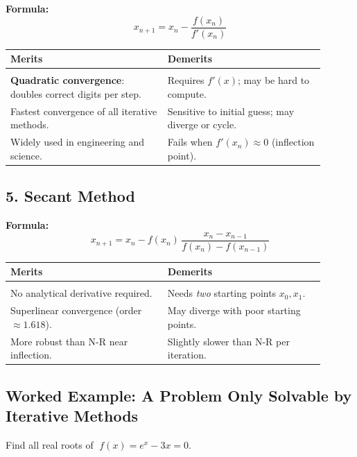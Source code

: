 \documentclass[12pt]{article}
\begin{document}
\textbf{Formula:}
\[
  x_{n+1} = x_n - \frac{f(x_n)}{f'(x_n)}
\]

\begin{observebox}
\begin{tabular}{p{0.45\linewidth} p{0.45\linewidth}}
\textbf{Merits} & \textbf{Demerits} \\[2pt]
\hline\\[-6pt]
\textbf{Quadratic convergence}: doubles correct digits per step. & Requires $f'(x)$; may be hard to compute. \\
Fastest convergence of all iterative methods. & Sensitive to initial guess; may diverge or cycle. \\
Widely used in engineering and science. & Fails when $f'(x_n) \approx 0$ (inflection point). \\
\end{tabular}
\end{observebox}

\vspace{8pt}
\subsection*{5. Secant Method}

\textbf{Formula:}
\[
  x_{n+1} = x_n - f(x_n)\,\frac{x_n - x_{n-1}}{f(x_n) - f(x_{n-1})}
\]

\begin{observebox}
\begin{tabular}{p{0.45\linewidth} p{0.45\linewidth}}
\textbf{Merits} & \textbf{Demerits} \\[2pt]
\hline\\[-6pt]
No analytical derivative required. & Needs \emph{two} starting points $x_0, x_1$. \\
Superlinear convergence (order $\approx 1.618$). & May diverge with poor starting points. \\
More robust than N-R near inflection. & Slightly slower than N-R per iteration. \\
\end{tabular}
\end{observebox}

\vspace{10pt}

\subsection*{Worked Example: A Problem Only Solvable by Iterative Methods}

\begin{problembox}
Find all real roots of $\;f(x) = e^x - 3x = 0$.
\end{problembox}
\end{document}
